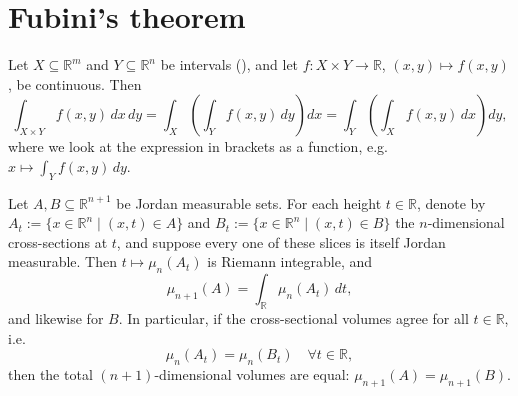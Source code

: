 
\section{Fubini's theorem}
\label{sec:fubini}

\begin{theorem}[Fubini]
\label{thm:fubini}
Let $X \subseteq \mathbb{R}^m$ and $Y \subseteq \mathbb{R}^n$ be intervals (), and let
$f : X\times Y \to \mathbb{R}$, $(x,y)\mapsto f(x,y)$, be continuous. Then
\[\int_{X\times Y} f(x,y)\,dx\,dy
  = \int_X\left(\int_Y f(x,y)\,dy\right)dx
  = \int_Y\left(\int_X f(x,y)\,dx\right)dy,\]
where we look at the expression in brackets as a function, e.g.\
$x \mapsto \int_Y f(x,y)\,dy$.
\end{theorem}

\begin{proposition}
\label{prop:cavalieri_principle}
Let $A, B \subseteq \mathbb{R}^{n+1}$ be Jordan measurable sets. For each height $t \in \mathbb{R}$, denote by $A_t := \{x \in \mathbb{R}^n \mid (x,t) \in A\}$ and $B_t := \{x \in \mathbb{R}^n \mid (x,t) \in B\}$ the $n$-dimensional cross-sections at $t$, and suppose every one of these slices is itself Jordan measurable. Then $t \mapsto \mu_n(A_t)$ is Riemann integrable, and
\[
\mu_{n+1}(A) = \int_{\mathbb{R}} \mu_n(A_t) \,dt,
\]
and likewise for $B$. In particular, if the cross-sectional volumes agree for all $t \in \mathbb{R}$, i.e.\
\[
\mu_n(A_t) = \mu_n(B_t) \quad \forall t \in \mathbb{R},
\]
then the total $(n+1)$-dimensional volumes are equal: $\mu_{n+1}(A) = \mu_{n+1}(B)$.
\end{proposition}

